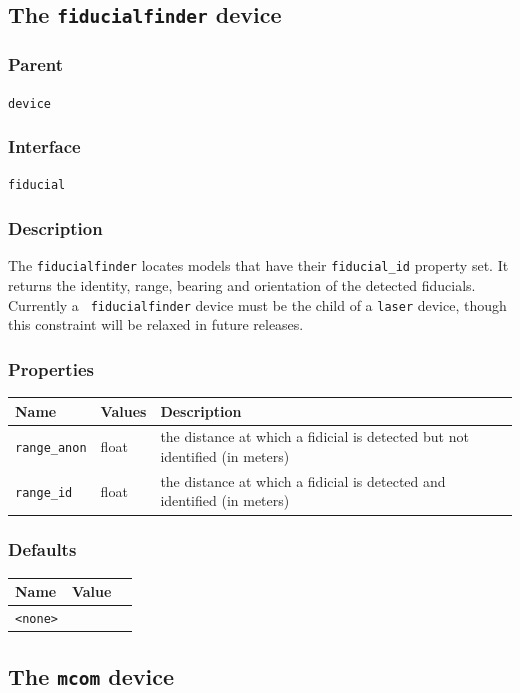 \documentclass[11pt,twoside]{report}
\begin{document}
\newpage
\subsection{The {\tt fiducialfinder} device}

\subsubsection*{Parent}
{\tt device}

\subsubsection*{Interface}
{\tt fiducial}

\subsubsection*{Description}

The \verb'fiducialfinder' locates models that have their
\verb'fiducial_id' property set. It returns the identity, range,
bearing and orientation of the detected fiducials.  Currently a {\tt
fiducialfinder} device must be the child of a {\tt laser} device,
though this constraint will be relaxed in future releases.

\subsubsection*{Properties}
\begin{tabularx}{\columnwidth}{llX}
\hline
Name & Values & Description \\
\hline
\verb'range_anon' & float & the distance at which a fidicial is detected but not identified (in meters)\\
\verb'range_id' & float & the distance at which a fidicial is detected and identified (in meters)\\
\hline
\end{tabularx}

\subsubsection*{Defaults}
\begin{tabularx}{\columnwidth}{llX}
\hline
Name & Value\\
\hline
\verb'<none>'\\
\hline
\end{tabularx}

\newpage
\subsection{The {\tt mcom} device}
\end{document}
